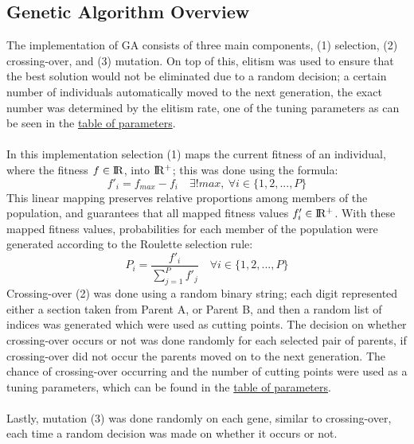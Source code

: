 \documentclass[paper=a4, fontsize=11pt]{scrartcl} %
\numberwithin{equation}{section} %
\numberwithin{figure}{section} %
\numberwithin{table}{section} %
\begin{document}
	\subsection{Genetic Algorithm Overview}\label{S11}
		The implementation of GA consists of three main components, (1) selection, (2) crossing-over, and (3) mutation. On top of this, elitism was used to ensure that the best solution would not be eliminated due to a random decision; a certain number of individuals automatically moved to the next generation, the exact number was determined by the elitism rate, one of the tuning parameters as can be seen in the \hyperref[T21]{table of parameters}.\\
		\\In this implementation selection (1) maps the current fitness of an individual, where the fitness $f \in {\rm I\!R}$, into ${\rm I\!R^+}$; this was done using the formula:\\
		\begin{equation}\label{E_MAP}
		f'_i = f_{max} - f_{i}\quad \exists! max, ~\forall i \in \{1,2,...,P\}
		\end{equation}
		This linear mapping preserves relative proportions among members of the population, and guarantees that all mapped fitness values $f'_i \in {\rm I\!R^+}$. With these mapped fitness values, probabilities for each member of the population were generated according to the Roulette selection rule:
		\begin{equation}\label{E_PROB}
		P_{i} = \frac{f'_{i}}{\sum_{j=1}^{P}f'_{j}}\quad \forall i \in \{1,2,...,P\}
		\end{equation}
		Crossing-over (2) was done using a random binary string; each digit represented either a section taken from Parent A, or Parent B, and then a random list of indices was generated which were used as cutting points. The decision on whether crossing-over occurs or not was done randomly for each selected pair of parents, if crossing-over did not occur the parents moved on to the next generation. The chance of crossing-over occurring and the number of cutting points were used as a tuning parameters, which can be found in the \hyperref[T21]{table of parameters}.\\
		\\ Lastly, mutation (3) was done randomly on each gene, similar to crossing-over, each time a random decision was made on whether it occurs or not.\\
	
\end{document}
